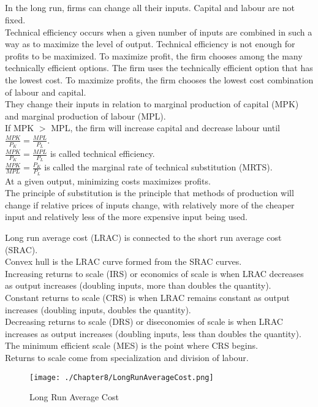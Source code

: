 \subsection{}
In the long run, firms can change all their inputs.
Capital and labour are not fixed.\\
Technical efficiency occurs when a given number of inputs are combined in such a way as to maximize the level of output.
Technical efficiency is not enough for profits to be maximized. To maximize profit,
the firm chooses among the many technically efficient options. The firm uses the technically efficient option that has the lowest cost.
To maximize profits, the firm chooses the lowest cost combination of labour and capital.\\
They change their inputs in relation to marginal production of capital (MPK) and marginal production of labour (MPL).\\
If MPK $>$ MPL, the firm will increase capital and decrease labour until $\frac{MPK}{P_K} = \frac{MPL}{P_L}$.\\
$\frac{MPK}{P_K} = \frac{MPL}{P_L}$ is called technical efficiency.\\
$\frac{MPK}{MPL} = \frac{P_K}{P_L}$ is called the marginal rate of technical substitution (MRTS).\\
At a given output, minimizing costs maximizes profits.\\
The principle of substitution is the principle that methods of production will change if relative prices of inputs change,
with relatively more of the cheaper input and relatively less of the more expensive input being used.
\par
Long run average cost (LRAC) is connected to the short run average cost (SRAC).\\
Convex hull is the LRAC curve formed from the SRAC curves.\\
Increasing returns to scale (IRS) or economics of scale is when LRAC decreases as output increases (doubling inputs, more than doubles the quantity).\\
Constant returns to scale (CRS) is when LRAC remains constant as output increases (doubling inputs, doubles the quantity).\\
Decreasing returns to scale (DRS) or diseconomies of scale is when LRAC increases as output increases (doubling inputs, less than doubles the quantity).\\
The minimum efficient scale (MES) is the point where CRS begins.\\
Returns to scale come from specialization and division of labour.
\begin{figure}[H]
\centering
\texttt{[image: ./Chapter8/LongRunAverageCost.png]}
\caption{Long Run Average Cost}
\end{figure}
